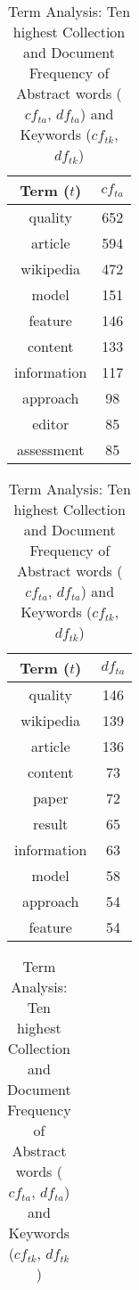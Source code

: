 \begin{table}[ht]
    \caption{Term Analysis: Ten highest Collection and Document Frequency of Abstract words ($cf_{ta}$, $df_{ta}$) and Keywords ($cf_{tk}$, $df_{tk}$)}
    \label{tab:terms}
    \begin{minipage}{.2\textwidth}
        \centering
        \begin{tabular}{c c}
            \toprule
            Term ($t$) & $cf_{ta}$ \\
            \midrule
            quality & 652 \\
            article & 594 \\
            wikipedia & 472 \\
            model & 151 \\
            feature & 146 \\
            content & 133 \\
            information & 117 \\
            approach & 98 \\
            editor & 85 \\
            assessment & 85 \\
            \bottomrule
        \end{tabular}
    \end{minipage}
    \begin{minipage}{.2\textwidth}
        \centering
        \begin{tabular}{c c}
            \toprule
            Term ($t$) & $df_{ta}$ \\
            \midrule
            quality & 146 \\
            wikipedia & 139 \\
            article & 136 \\
            content & 73 \\
            paper & 72 \\
            result & 65 \\
            information & 63 \\
            model & 58 \\
            approach & 54 \\
            feature & 54 \\
            \bottomrule
        \end{tabular}
    \end{minipage}
    \begin{minipage}{.2\textwidth}
        \centering
        \begin{tabular}{c c}

\end{tabular}
\end{minipage}
\end{table}
